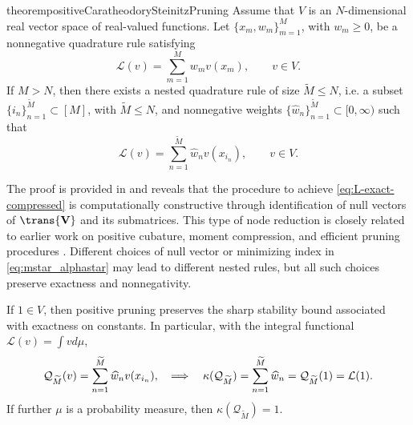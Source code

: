\documentclass[10pt,dvipsnames]{amsart}
\begin{document}
\begin{restatable}{theorem}{positiveCaratheodorySteinitzPruning}
\label{thm:caratheodory}
Assume that \(V\) is an \(N\)-dimensional real vector space of real-valued
functions.  Let \(\{x_m,w_m\}_{m=1}^M\), with \(w_m\ge0\), be a
nonnegative quadrature rule satisfying
\begin{equation}
\label{eq:L-exactness-assumption}
    \mathcal L(v)=\sum_{m=1}^M w_m v(x_m),
    \qquad v\in V.
\end{equation}
If \(M>N\), then there exists a nested quadrature rule of size $\widetilde M \leq N$, i.e. a subset
\(\{i_n\}_{n=1}^{\widetilde M}\subset [M]\), with
\(\widetilde M\le N\), and nonnegative weights
\(\{\widehat w_n\}_{n=1}^{\widetilde M}\subset [0,\infty)\) such that
\begin{equation}
\label{eq:L-exact-compressed}
    \mathcal L(v)=\sum_{n=1}^{\widetilde M}\widehat w_n v(x_{i_n}),
    \qquad v\in V.
\end{equation}
\end{restatable}
The proof is provided in  and reveals that the procedure to achieve \eqref{eq:L-exact-compressed} is computationally  constructive through identification of null vectors of $\trans{\mathbf V}$ and its submatrices. 
This type of node reduction is closely related to earlier work on positive cubature, moment compression, and efficient pruning procedures
\cite{Bos2016b,Bos2018b,Wilson1969,Cools1989,Rabinowitz1986,belik_efficient_2025}.
Different choices of null vector or
minimizing index in \eqref{eq:mstar_alphastar} may lead to different nested
rules, but all such choices preserve exactness and nonnegativity.

\begin{remark}
\label{rem:positive-pruned-stability}
If \(1\in V\), then positive pruning preserves the sharp stability bound
  associated with exactness on constants.  In particular, with the integral functional $\mathcal L(v) = \int v d\mu$,
\[
    \mathcal Q_{\widetilde M}(v)
    =
    \sum_{n=1}^{\widetilde M}\widehat w_n v(x_{i_n}), \hskip 10pt
    \Longrightarrow \hskip 10pt
    \kappa(\mathcal Q_{\widetilde M})
    =
    \sum_{n=1}^{\widetilde M}\widehat w_n
    =
    \mathcal Q_{\widetilde M}(1)
    =
    \mathcal L(1).
\]
If further \(\mu\) is a probability
measure, then \(\kappa(\mathcal Q_{\widetilde M})=1\).
\end{remark}
\end{document}
